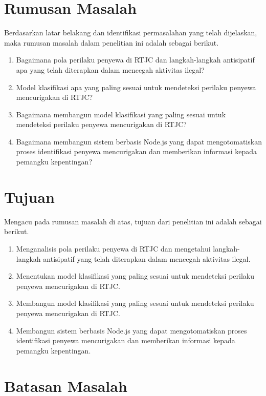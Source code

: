 \section{Rumusan Masalah}
\label{sec:rumusan}
Berdasarkan latar belakang dan identifikasi permasalahan yang telah dijelaskan, maka rumusan masalah dalam penelitian ini adalah sebagai berikut.
\begin{enumerate}
    \item Bagaimana pola perilaku penyewa di RTJC dan langkah-langkah antisipatif apa yang telah diterapkan dalam mencegah aktivitas ilegal?
    \item Model klasifikasi apa yang paling sesuai untuk mendeteksi perilaku penyewa mencurigakan di RTJC?
    \item Bagaimana membangun model klasifikasi yang paling sesuai untuk mendeteksi perilaku penyewa mencurigakan di RTJC?
    \item Bagaimana membangun sistem berbasis Node.js yang dapat mengotomatiskan proses identifikasi penyewa mencurigakan dan memberikan informasi kepada pemangku kepentingan?
\end{enumerate}

\section{Tujuan}
\label{sec:tujuan}
Mengacu pada rumusan masalah di atas, tujuan dari penelitian ini adalah sebagai berikut.
\begin{enumerate}
    \item Menganalisis pola perilaku penyewa di RTJC dan mengetahui langkah-langkah antisipatif yang telah diterapkan dalam mencegah aktivitas ilegal.
    \item Menentukan model klasifikasi yang paling sesuai untuk mendeteksi perilaku penyewa mencurigakan di RTJC.
    \item Membangun model klasifikasi yang paling sesuai untuk mendeteksi perilaku penyewa mencurigakan di RTJC.
    \item Membangun sistem berbasis Node.js yang dapat mengotomatiskan proses identifikasi penyewa mencurigakan dan memberikan informasi kepada pemangku kepentingan.
\end{enumerate}


\newpage
\section{Batasan Masalah}
\label{sec:batasan}

